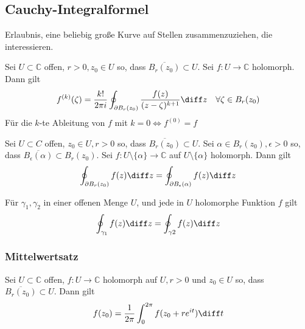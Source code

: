 \subsection{Cauchy-Integralformel}
Erlaubnis, eine beliebig große Kurve auf Stellen zusammenzuziehen, die interessieren.
\begin{emphbox}
    Sei $U\subset \mathbb C$ offen, $r>0, z_0\in U$ so, dass $\overline{B_r(z_0)}\subset U$.
    Sei $f:U\rightarrow\mathbb C$ holomorph. Dann gilt \begin{equation*}
        f^{(k)}(\zeta) = \frac{k!}{2\pi i}\oint_{\partial B_r(z_0)}\frac{f(z)}{(z-\zeta)^{k+1}}\diff z \quad \forall\zeta\in B_r(z_0)
    \end{equation*}
    Für die $k$-te Ableitung von $f$ mit $k=0 \Leftrightarrow f^{(0)}=f$
\end{emphbox}

\begin{sectionbox}
    \begin{emphbox}
        Sei $U\subset C$ offen, $z_0\in U, r > 0$ so, dass $\overline{B_r(z_0)}\subset U$. Sei $\alpha \in B_r(z_0), \epsilon > 0$ so, dass $\overline{B_\epsilon(\alpha)}\subset B_r(z_0)$.
        Sei $f:U\setminus\{\alpha\}\rightarrow\mathbb C$ auf $U\setminus\{\alpha\}$ holomorph.
        Dann gilt \begin{equation*}
            \oint_{\partial B_r(z_0)}f(z)\diff z = \oint_{\partial B_\epsilon(\alpha)}f(z)\diff z
        \end{equation*}
    \end{emphbox}
    \begin{emphbox}
        Für $\gamma_1, \gamma_2$ in einer offenen Menge $U$, und jede in $U$ holomorphe Funktion $f$ gilt
        \begin{equation*}
            \oint_{\gamma_1}f(z)\diff z = \oint_{\gamma 2}f(z)\diff z
        \end{equation*}
    \end{emphbox}

    \subsubsection{Mittelwertsatz}
    Sei $U\subset\mathbb C$ offen, $f:U\rightarrow\mathbb C$ holomorph auf $U, r>0$ und $z_0\in U$ so, dass $\overline{B_r(z_0)}\subset U$.
    Dann gilt \begin{equation*}
        f(z_0) = \frac{1}{2\pi}\int_0^{2\pi}f(z_0+re^{it})\diff t
    \end{equation*}
\end{sectionbox}

